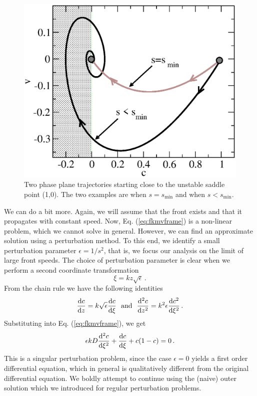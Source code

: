 \begin{figure}
\begin{center}
\includegraphics[scale=.4]{figs/minspeed}
\caption{\label{fig:minspeed} Two phase plane trajectories starting close to
	  the unstable saddle point (1,0). The  
	two examples are when $s = s_\text{min}$ and when $s < s_\text{min}$.
}
\end{center}
\end{figure}

We can do a bit more. Again, we will assume that the front exists and that it propagates with constant speed. 
Now, Eq. (\ref{eq:fkmvframe}) is a non-linear problem, which we cannot solve in general. However, we can find an 
approximate solution using a perturbation method. To this end, we identify a small perturbation parameter 
$\epsilon = 1/s^2$, that is, we focus our analysis on the limit of large front speeds. 
The choice of perturbation parameter is clear when we perform a second coordinate transformation  
\begin{equation} 
\xi = k z \sqrt{\epsilon} \, .
\end{equation}
From the chain rule we have the following identities
\begin{eqnarray}
	\frac{\d c}{\d z} = k\sqrt{\epsilon} \frac{\d c}{\d \xi} \ \ \text{and} \ \  
	\frac{\d^2 c}{\d z^2} = k^2 \epsilon \frac{\d c^2}{\d \xi^2} \, .
\end{eqnarray}
Substituting into Eq. (\ref{eq:fkmvframe}), we get
\begin{equation}
	\label{eq:fkinz}
\epsilon k D\frac{\mathrm{d}^2c}{\mathrm{d} \xi^2} + \frac{\mathrm{d} c}{\mathrm{d} \xi} + c(1-c) = 0 \, .
\end{equation}
This is a singular perturbation problem, since the case
$\epsilon=0$ yields a first order differential equation, which in general is
qualitatively different from the original differential equation. We boldly attempt to continue using the 
(naive) outer solution which we introduced for regular perturbation problems. 

